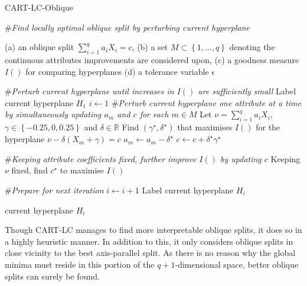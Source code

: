 \begin{algorithm}
\caption{CART-LC-Oblique}
\begin{algorithmic}
\STATE \#\emph{Find locally optimal oblique split by perturbing current hyperplane}

\medskip
\REQUIRE (a) an oblique split $\sum_{i=1}^q a_i X_i=c$, (b) a set $M\subset\left\{1,\ldots,q\right\}$ denoting the continuous attributes improvements are considered upon, (c) a goodness measure $I()$ for comparing hyperplanes (d) a tolerance variable $\epsilon$

\medskip
\STATE \#\emph{Perturb current hyperplane until increases in $I()$ are sufficiently small}
\STATE Label current hyperplane $H_1$
\STATE $i\leftarrow 1$
\REPEAT
	\STATE \#\emph{Perturb current hyperplane one attribute at a time by simultaneously updating $a_m$ and $c$ for each $m\in M$}
		\STATE Let $\nu=\sum_{i=1}^q a_iX_i$, $\gamma\in\left\{-0.25,0,0.25\right\}$ and $\delta\in\mathbb{R}$
		\STATE Find $(\gamma^\star,\delta^\star)$ that maximises $I()$ for the hyperplane $\nu-\delta(X_m+\gamma)=c$
		\STATE $a_m\leftarrow a_m-\delta^\star$ 
		\STATE $c\leftarrow c+\delta^\star\gamma^\star$ 
	\ENDFOR
	\medskip

	\STATE \#\emph{Keeping attribute coefficients fixed, further improve $I()$ by updating $c$}
	\STATE Keeping $\nu$ fixed, find $c^\star$ to maximise $I()$
	\medskip

	\STATE \#\emph{Prepare for next iteration}
	\STATE $i\leftarrow i+1$
	\STATE Label current hyperplane $H_i$

\medskip
\RETURN current hyperplane $H_i$
\end{algorithmic}
\label{CARTLCOblique}
\end{algorithm}

Though CART-LC manages to find more interpretable oblique splits, it does so in a highly heuristic manner. In addition to this, it only considers oblique splits in close vicinity to the best axis-parallel split. As there is no reason why the global minima must reside in this portion of the $q+1$-dimensional space, better oblique splits can surely be found.

